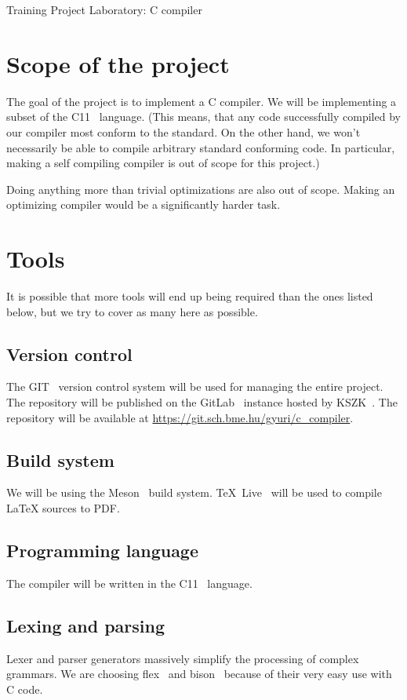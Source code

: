 \documentclass{article}
\begin{document}
\hfil {\Huge Training Project Laboratory: C compiler} \hfil

\section{Scope of the project}
The goal of the project is to implement a C compiler. We will be implementing a
subset of the C11~\cite{c11} language. (This means, that any code successfully
compiled by our compiler most conform to the standard. On the other hand, we
won't necessarily be able to compile arbitrary standard conforming code. In
particular, making a self compiling compiler is out of scope for this project.)

Doing anything more than trivial optimizations are also out of scope. Making an
optimizing compiler would be a significantly harder task.

\section{Tools}
It is possible that more tools will end up being required than the ones listed
below, but we try to cover as many here as possible.
\subsection{Version control}
The GIT~\cite{git} version control system will be used for managing the entire
project. The repository will be published on the GitLab~\cite{gitlab} instance
hosted by KSZK~\cite{kszk}. The repository will be available at
\url{https://git.sch.bme.hu/gyuri/c_compiler}.
\subsection{Build system}
We will be using the Meson~\cite{meson} build system. \TeX~Live~\cite{texlive}
will be used to compile \LaTeX{} sources to PDF.
\subsection{Programming language}
The compiler will be written in the C11~\cite{c11} language.
\subsection{Lexing and parsing}
Lexer and parser generators massively simplify the processing of complex
grammars. We are choosing flex~\cite{flex} and bison~\cite{bison} because of
their very easy use with C code.
\end{document}
